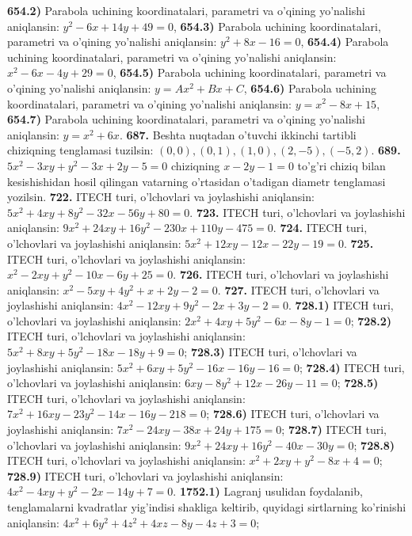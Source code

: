 \textbf{654.2)} Parabola uchining koordinatalari, parametri va o'qining yo'nalishi aniqlansin: $y^2-6 x+14 y+49=0$,
\textbf{654.3)} Parabola uchining koordinatalari, parametri va o'qining yo'nalishi aniqlansin: $y^2+8 x-16=0$,
\textbf{654.4)} Parabola uchining koordinatalari, parametri va o'qining yo'nalishi aniqlansin: $x^2-6 x-4 y+29=0$,
\textbf{654.5)} Parabola uchining koordinatalari, parametri va o'qining yo'nalishi aniqlansin: $y=A x^2+B x+C$,
\textbf{654.6)} Parabola uchining koordinatalari, parametri va o'qining yo'nalishi aniqlansin: $y=x^2-8 x+15$,
\textbf{654.7)} Parabola uchining koordinatalari, parametri va o'qining yo'nalishi aniqlansin: $y=x^2+6 x$.
\textbf{687.} Beshta nuqtadan o'tuvchi ikkinchi tartibli chiziqning tenglamasi tuzilsin: $(0,0),(0,1),(1,0),(2,-5),(-5,2)$.
\textbf{689.} $5 x^2-3 x y+y^2-3 x+2 y-5=0$ chiziqning $x-2 y-1=0$ to'g'ri chiziq bilan kesishishidan hosil qilingan vatarning o'rtasidan o'tadigan diametr tenglamasi yozilsin.
\textbf{722.} ITECH turi, o'lchovlari va joylashishi aniqlansin: $5 x^2+4 x y+8 y^2-32 x-56 y+80=0$.
\textbf{723.} ITECH turi, o'lchovlari va joylashishi aniqlansin: $9 x^2+24 x y+16 y^2-230 x+110 y-475=0$.
\textbf{724.} ITECH turi, o'lchovlari va joylashishi aniqlansin: $5 x^2+12 x y-12 x-22 y-19=0$.
\textbf{725.} ITECH turi, o'lchovlari va joylashishi aniqlansin: $x^2-2 x y+y^2-10 x-6 y+25=0$.
\textbf{726.} ITECH turi, o'lchovlari va joylashishi aniqlansin: $x^2-5 x y+4 y^2+x+2 y-2=0$.
\textbf{727.} ITECH turi, o'lchovlari va joylashishi aniqlansin: $4 x^2-12 x y+9 y^2-2 x+3 y-2=0$.
\textbf{728.1)} ITECH turi, o'lchovlari va joylashishi aniqlansin: $2 x^2+4 x y+5 y^2-6 x-8 y-1=0$;
\textbf{728.2)} ITECH turi, o'lchovlari va joylashishi aniqlansin: $5 x^2+8 x y+5 y^2-18 x-18 y+9=0$;
\textbf{728.3)} ITECH turi, o'lchovlari va joylashishi aniqlansin: $5 x^2+6 x y+5 y^2-16 x-16 y-16=0$;
\textbf{728.4)} ITECH turi, o'lchovlari va joylashishi aniqlansin: $6 x y-8 y^2+12 x-26 y-11=0$;
\textbf{728.5)} ITECH turi, o'lchovlari va joylashishi aniqlansin: $7 x^2+16 x y-23 y^2-14 x-16 y-218=0$;
\textbf{728.6)} ITECH turi, o'lchovlari va joylashishi aniqlansin: $7 x^2-24 x y-38 x+24 y+175=0$;
\textbf{728.7)} ITECH turi, o'lchovlari va joylashishi aniqlansin: $9 x^2+24 x y+16 y^2-40 x-30 y=0$;
\textbf{728.8)} ITECH turi, o'lchovlari va joylashishi aniqlansin: $x^2+2 x y+y^2-8 x+4=0$;
\textbf{728.9)} ITECH turi, o'lchovlari va joylashishi aniqlansin: $4 x^2-4 x y+y^2-2 x-14 y+7=0$.
\textbf{1752.1)} Lagranj usulidan foydalanib, tenglamalarni kvadratlar yig'indisi shakliga keltirib, quyidagi sirtlarning ko'rinishi aniqlansin: $4 x^2+6 y^2+4 z^2+4 x z-8 y-4 z+3=0$;
